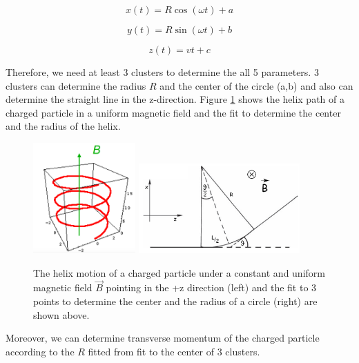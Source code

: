 \begin{equation}
x(t) = R \cos(\omega t) + a
\end{equation}

\begin{equation}
y(t) = R \sin(\omega t) + b
\end{equation}

\begin{equation}
z(t) = v t + c
\end{equation}

Therefore, we need at least 3 clusters to determine the all 5 parameters. 3 clusters can determine the radius $R$ and the center of the circle (a,b) and also can determine the straight line in the z-direction. Figure \ref{HelixAndFit} shows the helix path of a charged particle in a uniform magnetic field and the fit to determine the center and the radius of the helix.


\begin{figure}[hbtp]
\begin{center}
\includegraphics[width=0.35\textwidth]{Figures/Chapter4/Helix.png}
\includegraphics[width=0.55\textwidth]{Figures/Chapter4/FitToCircle.png}
\caption{The helix motion of a charged particle under a constant and uniform magnetic field $\vec{B}$ pointing in the +z direction (left) and the fit to 3 points to determine the center and the radius of a circle (right) are shown above.}
\label{HelixAndFit}
\end{center}
\end{figure} 

Moreover, we can determine transverse momentum of the charged particle according to the $R$ fitted from fit to the center of 3 clusters.

